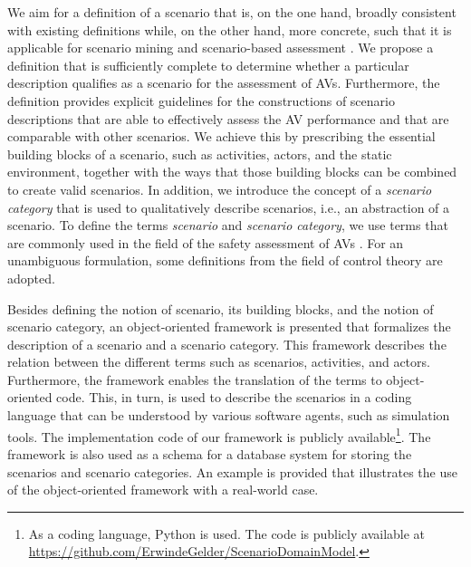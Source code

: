 We aim for a definition of a scenario that is, on the one hand, broadly consistent with existing definitions \autocite{geyer2014, ulbrich2015, elrofai2016scenario} while, on the other hand, more concrete, such that it is applicable for scenario mining \autocite{elrofai2016scenario} and scenario-based assessment \autocite{stellet2015taxonomy, deGelder2017assessment, pegasus2019}. 
We propose a definition that is \cstartb sufficiently complete to determine whether a particular description qualifies as a scenario for the assessment of AVs. 
Furthermore, the definition provides explicit guidelines for the constructions of scenario descriptions that are able to effectively assess the AV performance and that are comparable with other scenarios.
We achieve this by prescribing the essential building blocks of a scenario, such as activities, actors, and the static environment, together with the ways that those building blocks can be combined to create valid scenarios. \cendb
In addition, we introduce the concept of a \emph{scenario category}  
that is used to qualitatively describe scenarios, i.e., an abstraction of a scenario. 
To define the terms \emph{scenario} and \emph{scenario category}, we use terms that are commonly used in the field of the safety assessment of AVs \autocite{geyer2014, ulbrich2015, catapult2018musicc, catapult2018regulating, sigsim2019glossary, openscenario}. For an unambiguous formulation, some definitions from the field of control theory are adopted. 

Besides defining the notion of scenario, its building blocks, and the notion of scenario category, an \cstartb object-oriented framework \cendb is presented that formalizes the description of a scenario and a scenario category. 
This \cstartb framework \cendb describes the relation between the different terms such as scenarios, activities, and actors.
Furthermore, the \cstartb framework \cendb enables the translation of the terms to object-oriented code.
This, in turn, is used to describe the scenarios in a coding language that can be understood by various software agents, such as simulation tools. 
The implementation code of our \cstartb framework \cendb is publicly available\footnote{As a coding language, Python is used. The code is publicly available at \url{https://github.com/ErwindeGelder/ScenarioDomainModel}.}. 
The \cstartb framework \cendb is also used as a schema for a database system for storing the scenarios and scenario categories.
An example is provided that illustrates the use of the \cstartb object-oriented framework \cendb with a real-world case.

